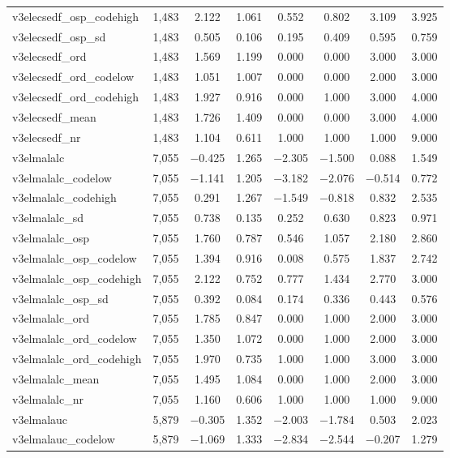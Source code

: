 \begin{table}[!htbp]
\begin{tabular}{@{\extracolsep{5pt}}lccccccc}
v3elecsedf\_osp\_codehigh & 1,483 & 2.122 & 1.061 & 0.552 & 0.802 & 3.109 & 3.925 \\ 
v3elecsedf\_osp\_sd & 1,483 & 0.505 & 0.106 & 0.195 & 0.409 & 0.595 & 0.759 \\ 
v3elecsedf\_ord & 1,483 & 1.569 & 1.199 & 0.000 & 0.000 & 3.000 & 3.000 \\ 
v3elecsedf\_ord\_codelow & 1,483 & 1.051 & 1.007 & 0.000 & 0.000 & 2.000 & 3.000 \\ 
v3elecsedf\_ord\_codehigh & 1,483 & 1.927 & 0.916 & 0.000 & 1.000 & 3.000 & 4.000 \\ 
v3elecsedf\_mean & 1,483 & 1.726 & 1.409 & 0.000 & 0.000 & 3.000 & 4.000 \\ 
v3elecsedf\_nr & 1,483 & 1.104 & 0.611 & 1.000 & 1.000 & 1.000 & 9.000 \\ 
v3elmalalc & 7,055 & $-$0.425 & 1.265 & $-$2.305 & $-$1.500 & 0.088 & 1.549 \\ 
v3elmalalc\_codelow & 7,055 & $-$1.141 & 1.205 & $-$3.182 & $-$2.076 & $-$0.514 & 0.772 \\ 
v3elmalalc\_codehigh & 7,055 & 0.291 & 1.267 & $-$1.549 & $-$0.818 & 0.832 & 2.535 \\ 
v3elmalalc\_sd & 7,055 & 0.738 & 0.135 & 0.252 & 0.630 & 0.823 & 0.971 \\ 
v3elmalalc\_osp & 7,055 & 1.760 & 0.787 & 0.546 & 1.057 & 2.180 & 2.860 \\ 
v3elmalalc\_osp\_codelow & 7,055 & 1.394 & 0.916 & 0.008 & 0.575 & 1.837 & 2.742 \\ 
v3elmalalc\_osp\_codehigh & 7,055 & 2.122 & 0.752 & 0.777 & 1.434 & 2.770 & 3.000 \\ 
v3elmalalc\_osp\_sd & 7,055 & 0.392 & 0.084 & 0.174 & 0.336 & 0.443 & 0.576 \\ 
v3elmalalc\_ord & 7,055 & 1.785 & 0.847 & 0.000 & 1.000 & 2.000 & 3.000 \\ 
v3elmalalc\_ord\_codelow & 7,055 & 1.350 & 1.072 & 0.000 & 1.000 & 2.000 & 3.000 \\ 
v3elmalalc\_ord\_codehigh & 7,055 & 1.970 & 0.735 & 1.000 & 1.000 & 3.000 & 3.000 \\ 
v3elmalalc\_mean & 7,055 & 1.495 & 1.084 & 0.000 & 1.000 & 2.000 & 3.000 \\ 
v3elmalalc\_nr & 7,055 & 1.160 & 0.606 & 1.000 & 1.000 & 1.000 & 9.000 \\ 
v3elmalauc & 5,879 & $-$0.305 & 1.352 & $-$2.003 & $-$1.784 & 0.503 & 2.023 \\ 
v3elmalauc\_codelow & 5,879 & $-$1.069 & 1.333 & $-$2.834 & $-$2.544 & $-$0.207 & 1.279 \\ 

\end{tabular}
\end{table}
